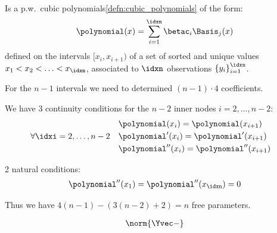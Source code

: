 \begin{defnbox}\nospacing
    \begin{defn}\label{defn:splines}\leavevmode\\
        \begin{minipage}[b]{0.58\textwidth}
            Is a p.w.\ cubic polynomials\cref{defn:cubic_polynomials} of the form:
            \begin{align}
              \polynomial(x)=\sum_{i=1}^{\idxn}\betac_{i}\Basis_{j}(x)
            \end{align}
            defined on the intervals $[x_{i},x_{i+1})$ of a
            set of sorted and unique values $x_{1}<x_{2}<\ldots<x_{\idxn}$, associated to $\idxn$ observations $\left\{y_{i}\right\}_{i=1}^{\idxn}$.
        \end{minipage}\hfil
        \begin{minipage}[c]{0.4\textwidth}
        \centering{
          \resizebox{\linewidth}{!}{}
        }
        \end{minipage}
        \begin{itemizenosep}
            \item For the $n-1$ intervals we need to determined $(n-1)\cdot 4$ coefficients.
            \item We have 3 continuity conditions for the $n-2$ inner nodes $i=2,\ldots,n-2$:
            \begin{align}
              &\forall\idxi=2,\ldots,n-2&&
              \begin{aligned}
                  &\polynomial(x_{i})=\polynomial(x_{i+1})\\
                  &\polynomial'(x_{i})=\polynomial'(x_{i+1})\\
                  &\polynomial''(x_{i})=\polynomial''(x_{i+1})
              \end{aligned}
            \end{align}
            \item 2 natural conditions:
            \begin{align}
              \polynomial''(x_{1})=\polynomial''(x_{\idxn})=0
            \end{align}
        \end{itemizenosep}
        Thus we have $4(n-1)-\left(3(n-2)+2\right)=n$ free parameters.
    \end{defn}
\end{defnbox}
\begin{corbox}\nospacing
    \begin{cor}\label{cor:solution}
       \begin{align}
         \norm{\Yvec-}
       \end{align}
    \end{cor}
\end{corbox}

